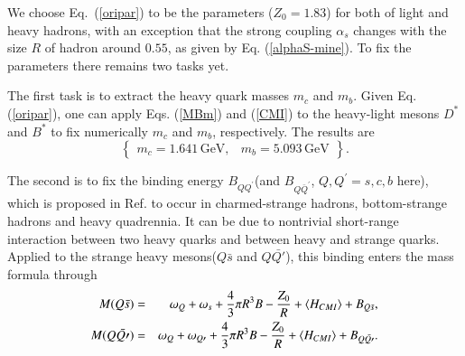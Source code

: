 \documentclass[12pt,prd,onecolumn,floatfix,nofootinbib]{revtex4}
\begin{document}
We choose Eq.~(\ref{oripar}) to be the parameters ($Z_{0}=1.83$) for both 
of light and heavy hadrons, with an exception that the strong coupling 
$\alpha _{s}$ changes with the size $R$ of hadron around $0.55$, as given 
by Eq. (\ref{alphaS-mine}). To fix the parameters there remains two tasks yet.

The first task is to extract the heavy quark masses $m_{c}$ and $m_{b}$.
Given Eq. (\ref{oripar}), one can apply Eqs. (\ref{MBm}) and (\ref{CMI}) to
the heavy-light mesons $D^{\ast }$ and $B^{\ast }$ to fix numerically $m_{c}$
and $m_{b}$, respectively. The results are
\begin{equation}
\begin{Bmatrix}
m_{c}=1.641\,\text{GeV}, & m_{b}=5.093\,\text{GeV}%
\end{Bmatrix}%
.  \label{mcmb}
\end{equation}

The second is to fix the binding energy $B_{QQ^{\prime }}$(and $B_{Q\bar{Q}%
^{\prime }}$, $Q,Q^{\prime }=s,c,b$ here), which is proposed in Ref. \cite%
{KR:2014gca} to occur in charmed-strange hadrons, bottom-strange hadrons and
heavy quadrennia. It can be due to nontrivial short-range interaction
between two heavy quarks and between heavy and strange quarks\cite%
{KR:2014gca,Karliner:2017elp,Karliner:2018bms}. Applied to the strange heavy
mesons($Q\bar{s}$ and $Q\bar{Q\prime }$), this binding enters the mass
formula through
\begin{eqnarray}
M(Q\bar{s}) &=&\omega _{Q}+\omega _{s}+\frac{4}{3}\pi R^{3}B-\frac{Z_{0}}{R}%
+\langle H_{CMI}\rangle +B_{Q\bar{s}},  \notag \\
M(Q\bar{Q\prime }) &=&\omega _{Q}+\omega _{Q\prime }+\frac{4}{3}\pi R^{3}B-%
\frac{Z_{0}}{R}+\langle H_{CMI}\rangle +B_{Q\bar{Q\prime }}.  \label{HLm0}
\end{eqnarray}
\end{document}
